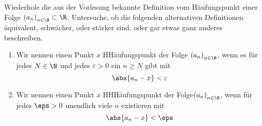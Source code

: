 \begin{prob}
  Wiederhole die aus der Vorlesung bekannte Definition vom Häufungspunkt einer
  Folge $\left(a_n\right)_{n \in \N} \subset \R$. Untersuche, ob die folgenden
  alternativen Definitionen äquivalent, schwächer, oder stärker sind, oder gar
  etwas ganz anderes beschreiben.
  \begin{enumerate}[label=(\alph*)]
  \item Wir nennen einen Punkt $x$ HHäufungspunkt der Folge
    $\left(a_n\right)_{n\in\N}$, wenn es für jedes $N \in \N$ und jedes
    $\varepsilon > 0$ ein $n \geqslant N$ gibt mit
    \begin{equation*}
      \abs{a_n - x} < \varepsilon
    \end{equation*}
  \item Wir nennen einen Punkt $x$ HHHäufungspunkt der
    Folge$\left(a_n\right)_{n\in\N}$, wenn für jedes $\eps > 0$ unendlich viele
    $n$ existieren mit
    \begin{equation*}
      \abs{a_n - x} < \eps
    \end{equation*}
  \end{enumerate}
\end{prob}
